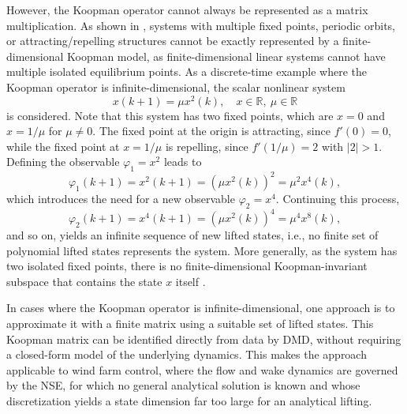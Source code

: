 However, the Koopman operator cannot always be represented as a matrix multiplication. As shown in \cite{brunton2016koopman}, systems with multiple fixed points, periodic orbits, or attracting/repelling structures cannot be exactly represented by a finite-dimensional Koopman model, as finite-dimensional linear systems cannot have multiple isolated equilibrium points.
As a discrete-time example where the Koopman operator is infinite-dimensional,  the scalar nonlinear system
\begin{equation}
    x(k+1) = \mu x^2(k), \quad x \in \mathbb{R}, \ \mu \in \mathbb{R}
\end{equation}
is considered. Note that this system has two fixed points, which are $x=0$ and $x=1/\mu$ for $\mu \neq 0$. The fixed point at the origin is attracting, since $f'(0)=0$, 
while the fixed point at $x=1/\mu$ is repelling, since $f'(1/\mu)=2$ with $|2|>1$. Defining the observable \( \varphi_1 = x^2 \) leads to
\begin{equation}
    \varphi_1(k+1) = x^2(k+1) = (\mu x^2(k))^2 = \mu^2 x^4(k),
\end{equation}
which introduces the need for a new observable \( \varphi_2 = x^4 \). Continuing this process,
\begin{equation}
    \varphi_2(k+1) = x^4(k+1) = (\mu x^2(k))^4 = \mu^4 x^8(k),
\end{equation}
and so on, yields an infinite sequence of new lifted states, i.e., no finite set of polynomial lifted states represents the system. More generally, as the system has two isolated fixed points, there is no finite-dimensional Koopman-invariant subspace that contains the state $x$ itself \cite{brunton2016koopman}.

In cases where the Koopman operator is infinite-dimensional, one approach is to approximate it with a finite matrix using a suitable set of lifted states. This Koopman matrix can be identified directly from data by DMD, without requiring a closed-form model of the underlying dynamics. This makes the approach applicable to wind farm control, where the flow and wake dynamics are governed by the NSE, for which no general analytical solution is known and whose discretization yields a state dimension far too large for an analytical lifting.


